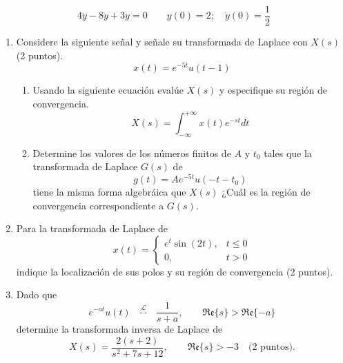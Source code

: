 \begin{equation}\label{key}
4\ddot{y}-8\dot{y}+3y=0\qquad y(0)=2;\quad \dot{y}(0)=\frac{1}{2}
\end{equation}\newpage

\begin{enumerate}
	\item Considere la siguiente señal	y señale su transformada de Laplace con $ X(s) $ 
	(2 puntos).
	\begin{equation*}\label{key}
	x(t)=e^{-5t}u(t-1)
	\end{equation*}
	\begin{enumerate}
		\item Usando la siguiente ecuación evalúe $ X(s) $ y especifique su región de convergencia.
		\begin{equation*}\label{key}
		X(s)=\int_{-\infty}^{+\infty}x(t)e^{-st}dt
		\end{equation*}
		\item Determine los valores de los números finitos de $ A $ y $ t_0 $ tales que la transformada de Laplace $ G(s) $ de 
		\begin{equation*}\label{key}
		g(t)=Ae^{-5t}u(-t-t_0)
		\end{equation*} 
		tiene la misma forma algebráica que $ X(s) $ ¿Cuál es la región de convergencia correspondiente a $ G(s) $.
	\end{enumerate}
	\item Para la transformada de Laplace de 
	\begin{equation*}\label{key}
	x(t)=\left \{\begin{array}{cc}
	e^t\sin(2t), & t\leq0\\
	0, & t>0
	\end{array}\right .
	\end{equation*}
	indique la localización de sus polos y su región de convergencia (2 puntos).
	\item Dado que
	\begin{equation*}\label{key}
	e^{-at}u(t)\quad {}^{\underset{\longleftrightarrow}{\mathcal{L}}}\quad\frac{1}{s+a},\qquad \mathfrak{Re}\{s\}>\mathfrak{Re}\{-a\}
	\end{equation*}
	determine la transformada inversa de Laplace de 
	\begin{equation*}\label{key}
	X(s)=\frac{2(s+2)}{s^2+7s+12},\qquad \mathfrak{Re}\{s\}>-3 \quad \mbox{(2 puntos).}
	\end{equation*}
	

\end{enumerate}
